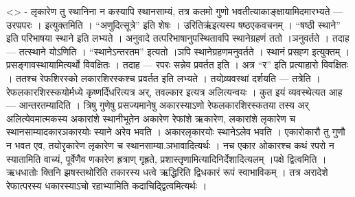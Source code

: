 \textless{}\textgreater{} - लृकारेण तु स्थानिना न कस्यापि स्थानसाम्यं,
तत्र कतमो गुणो भवतीत्याकाङ्क्षायामिदमारभ्यते --- उरण्रपरः । इत्युक्तमिति
। ``अणुदित्सूत्रे'' इति शेषः । उरितिऋ॑इत्यस्य षष्ठएकवचनम् । ``षष्ठी
स्थाने'' इति परिभाषया स्थाने इति लभ्यते । अनुवादे तत्परिभाषानुपस्थितावपि
स्थानेग्रहणं ततो ।ञनुवर्तते । तदाह --- तत्स्थाने योऽणिति ।
``स्थानेऽन्तरतम'' इत्यतो ।ञपि स्थानेग्रहणमनुवर्तते । स्थानं प्रसह्ग
इत्युक्तम् । प्रसङ्गावस्थायामित्यर्थो विवक्षितः । तदाह --- रपरः सन्नेव
प्रवर्तत इति । अत्र ``र'' इति प्रत्याहारो विवक्षितः । ततश्च रेफशिरस्को
लकारशिरस्कश्च प्रवर्तत इति लभ्यते । तयोव्र्यवस्थां दर्शयति --- तत्रेति ।
रेफलकारशिरस्कयोर्मध्ये कृष्णर्दिंधरित्यत्र अर्, तवल्कार इत्यत्र
अलित्यन्वयः । कुत इयं व्यवस्थेत्यत आह --- आन्तरतम्यादिति । त्रिषु गुणेषु
प्रसज्यमानेषु अकारस्याऽणो रेफलकारशिरस्कतया तस्य अर् अलित्येवमात्मकस्य
अकारांशे स्थानीभूतेन अकारेण रेफांशे ऋकारेण, लकारांशे लृकारेण च
स्थानसाम्यादकारञकारयोः स्याने अरेव भवति । अकारलृकारयोः स्थानेऽलेव भवति ।
एकारोकारौ तु गुणौ न भवत एव, तयोरृकारेण लृकारेण च
स्थानसाम्या.ञभावादित्यर्थः । नच एकार ओकारश्च कथं रपरो न स्यातामिति
वाच्यं, पूर्वेणैव णकारेण ह्रत्राण् गृह्रते,
प्रशास्तृणामित्यादिनिर्देशादित्यलम् ।पक्षे द्वित्वमिति । ऋधधातोः क्तिनि
झषस्तथोरिति तकारस्य धत्वे ऋद्धिरिति द्विधकारं रूपं स्वाभाविकम् । तत्र
अरादेशे रेफात्परस्य धकारस्याऽचो रहाभ्यामिति कदाचिद्द्वित्वमित्यर्थः ।

